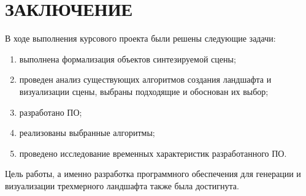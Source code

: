\chapter*{ЗАКЛЮЧЕНИЕ}

В ходе выполнения курсового проекта были решены следующие задачи: 

\begin{enumerate}[label={\arabic*)}]
	\item выполнена формализация объектов синтезируемой сцены;
	\item проведен анализ существующих алгоритмов создания ландшафта и визуализации сцены, выбраны подходящие и обоснован их выбор;
	\item разработано ПО;
	\item реализованы выбранные алгоритмы;
	\item проведено исследование временных характеристик разработанного ПО.
\end{enumerate}

Цель работы, а именно разработка программного обеспечения для генерации и визуализации трехмерного ландшафта также была достигнута.
